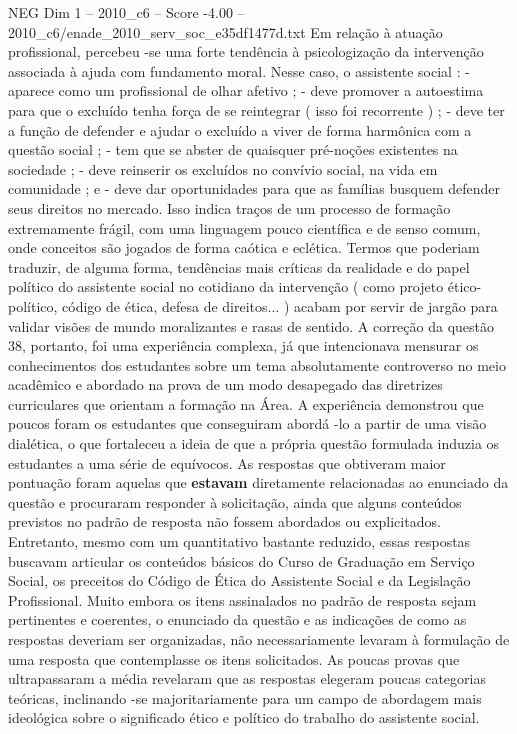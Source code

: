 \begin{textsample}{NEG Dim 1 – 2010\_c6 – Score -4.00 – 2010\_c6/enade\_2010\_serv\_soc\_e35df1477d.txt}
Em relação à atuação profissional, percebeu -se uma forte tendência à psicologização da intervenção associada à ajuda com fundamento moral.
Nesse caso, o assistente social : - aparece como um profissional de olhar afetivo ; - deve promover a autoestima para que o excluído tenha força de se reintegrar ( isso foi recorrente ) ; - deve ter a função de defender e ajudar o excluído a viver de forma harmônica com a questão social ; - tem que se abster de quaisquer pré-noções existentes na sociedade ; - deve reinserir os excluídos no convívio social, na vida em comunidade ; e - deve dar oportunidades para que as famílias busquem defender seus direitos no mercado.
Isso indica traços de um processo de formação extremamente frágil, com uma linguagem pouco científica e de senso comum, onde conceitos são jogados de forma caótica e eclética.
Termos que poderiam traduzir, de alguma forma, tendências mais críticas da realidade e do papel político do assistente social no cotidiano da intervenção ( como projeto ético-político, código de ética, defesa de direitos... ) acabam por servir de jargão para validar visões de mundo moralizantes e rasas de sentido.
A correção da questão 38, portanto, foi uma experiência complexa, já que intencionava mensurar os conhecimentos dos estudantes sobre um tema absolutamente controverso no meio acadêmico e abordado na prova de um modo desapegado das diretrizes curriculares que orientam a formação na Área.
A experiência demonstrou que poucos foram os estudantes que conseguiram abordá -lo a partir de uma visão dialética, o que fortaleceu a ideia de que a própria questão formulada induzia os estudantes a uma série de equívocos.
As respostas que obtiveram maior pontuação foram aquelas que \textbf{estavam} diretamente relacionadas ao enunciado da questão e procuraram responder à solicitação, ainda que alguns conteúdos previstos no padrão de resposta não fossem abordados ou explicitados.
Entretanto, mesmo com um quantitativo bastante reduzido, essas respostas buscavam articular os conteúdos básicos do Curso de Graduação em Serviço Social, os preceitos do Código de Ética do Assistente Social e da Legislação Profissional.
Muito embora os itens assinalados no padrão de resposta sejam pertinentes e coerentes, o enunciado da questão e as indicações de como as respostas deveriam ser organizadas, não necessariamente levaram à formulação de uma resposta que contemplasse os itens solicitados.
As poucas provas que ultrapassaram a média revelaram que as respostas elegeram poucas categorias teóricas, inclinando -se majoritariamente para um campo de abordagem mais ideológica sobre o significado ético e político do trabalho do assistente social.

\end{textsample}
